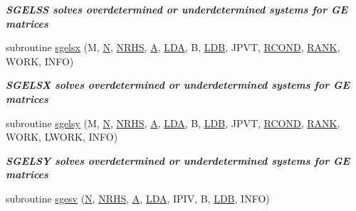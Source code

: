 \begin{DoxyCompactItemize}
\begin{DoxyCompactList}\small\item\em {\bfseries  S\+G\+E\+L\+S\+S solves overdetermined or underdetermined systems for G\+E matrices} \end{DoxyCompactList}\item 
subroutine \hyperlink{group__realGEsolve_gafa85959c07f700d3f4240a2f4132e3b1}{sgelsx} (M, \hyperlink{polmisc_8c_a0240ac851181b84ac374872dc5434ee4}{N}, \hyperlink{example__user_8c_aa0138da002ce2a90360df2f521eb3198}{N\+R\+H\+S}, \hyperlink{classA}{A}, \hyperlink{example__user_8c_ae946da542ce0db94dced19b2ecefd1aa}{L\+D\+A}, B, \hyperlink{example__user_8c_a50e90a7104df172b5a89a06c47fcca04}{L\+D\+B}, J\+P\+V\+T, \hyperlink{superlu__enum__consts_8h_af00a42ecad444bbda75cde1b64bd7e72a9b5c151728d8512307565994c89919d5}{R\+C\+O\+N\+D}, \hyperlink{splinemodule_8c_a3a88bcc63386de30443dacede2e01847}{R\+A\+N\+K}, W\+O\+R\+K, I\+N\+F\+O)
\begin{DoxyCompactList}\small\item\em {\bfseries  S\+G\+E\+L\+S\+X solves overdetermined or underdetermined systems for G\+E matrices} \end{DoxyCompactList}\item 
subroutine \hyperlink{group__realGEsolve_gaebb028f1d50049bcf4780ffc8cb4f750}{sgelsy} (M, \hyperlink{polmisc_8c_a0240ac851181b84ac374872dc5434ee4}{N}, \hyperlink{example__user_8c_aa0138da002ce2a90360df2f521eb3198}{N\+R\+H\+S}, \hyperlink{classA}{A}, \hyperlink{example__user_8c_ae946da542ce0db94dced19b2ecefd1aa}{L\+D\+A}, B, \hyperlink{example__user_8c_a50e90a7104df172b5a89a06c47fcca04}{L\+D\+B}, J\+P\+V\+T, \hyperlink{superlu__enum__consts_8h_af00a42ecad444bbda75cde1b64bd7e72a9b5c151728d8512307565994c89919d5}{R\+C\+O\+N\+D}, \hyperlink{splinemodule_8c_a3a88bcc63386de30443dacede2e01847}{R\+A\+N\+K}, W\+O\+R\+K, L\+W\+O\+R\+K, I\+N\+F\+O)
\begin{DoxyCompactList}\small\item\em {\bfseries  S\+G\+E\+L\+S\+Y solves overdetermined or underdetermined systems for G\+E matrices} \end{DoxyCompactList}\item 
subroutine \hyperlink{group__realGEsolve_ga3b05fb3999b3d7351cb3101a1fd28e78}{sgesv} (\hyperlink{polmisc_8c_a0240ac851181b84ac374872dc5434ee4}{N}, \hyperlink{example__user_8c_aa0138da002ce2a90360df2f521eb3198}{N\+R\+H\+S}, \hyperlink{classA}{A}, \hyperlink{example__user_8c_ae946da542ce0db94dced19b2ecefd1aa}{L\+D\+A}, I\+P\+I\+V, B, \hyperlink{example__user_8c_a50e90a7104df172b5a89a06c47fcca04}{L\+D\+B}, I\+N\+F\+O)

\end{DoxyCompactItemize}
